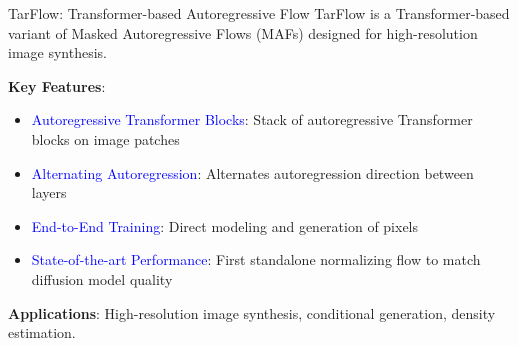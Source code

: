 \documentclass[aspectratio=169]{beamer}
\begin{document}
\begin{frame}{TarFlow: Transformer-based Autoregressive Flow}
TarFlow is a Transformer-based variant of Masked Autoregressive Flows (MAFs) designed for high-resolution image synthesis.

\textbf{Key Features}:
\begin{itemize}
    \item \textcolor{blue}{Autoregressive Transformer Blocks}: Stack of autoregressive Transformer blocks on image patches
    \item \textcolor{blue}{Alternating Autoregression}: Alternates autoregression direction between layers
    \item \textcolor{blue}{End-to-End Training}: Direct modeling and generation of pixels
    \item \textcolor{blue}{State-of-the-art Performance}: First standalone normalizing flow to match diffusion model quality
\end{itemize}

\textbf{Applications}: High-resolution image synthesis, conditional generation, density estimation.
\end{frame}
\end{document}
